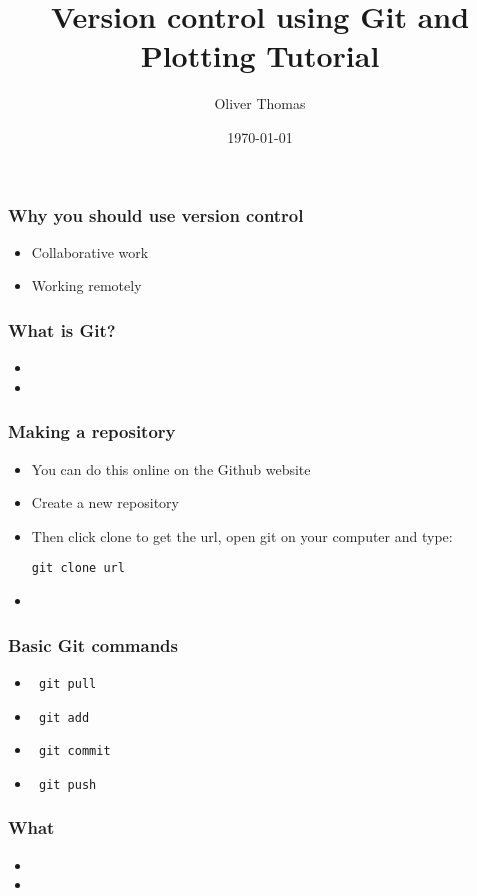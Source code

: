 \documentclass{beamer}
\title{Version control using Git and Plotting Tutorial}
\author{Oliver Thomas}
\institute{Quantum Engineering CDT \\ University of Bristol}
\date{\today}
\begin{document}
\frame{\titlepage}

\begin{frame}
\frametitle{Why you should use version control}
\begin{itemize}
\item Collaborative work  
\item Working remotely
\end{itemize}
\end{frame}

\begin{frame}
\frametitle{What is Git?}
\begin{itemize}
\item  
\item
\end{itemize}
\end{frame}

\begin{frame}
\frametitle{Making a repository}
\begin{itemize}
\item You can do this online on the Github website   
\item Create a new repository
\item Then click clone to get the url, open git on your computer and type: 
\begin{verbatim}
git clone url
\end{verbatim}
\item 
\end{itemize}
\end{frame}

\begin{frame}
\frametitle{Basic Git commands}
\begin{itemize}
	\item \begin{verbatim} git pull \end{verbatim} 
	\item \begin{verbatim} git add \end{verbatim}
	\item \begin{verbatim} git commit \end{verbatim}
	\item \begin{verbatim} git push \end{verbatim}
\end{itemize}
\end{frame}

\begin{frame}
\frametitle{What} 
\begin{itemize}
\item 
\item
\end{itemize}
\end{frame}

\begin{frame}
\frametitle{}
\end{frame}
\end{document}
